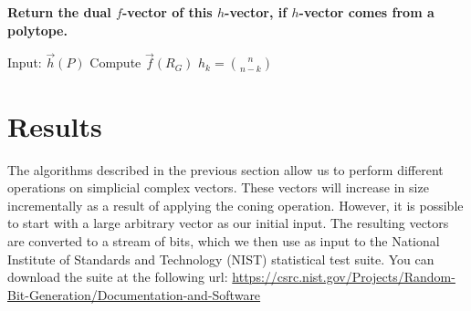 \documentclass[oneside,12pt]{amsart}
\theoremstyle{definition}
\numberwithin{equation}{section}
\begin{document}
\vspace{.5in}

\begin{center}
\textbf{Return the dual $f$-vector of this $h$-vector, if $h$-vector comes from a polytope.}
\end{center}

\vspace{.1in}


\begin{algorithmic}
\State Input: $\overrightarrow{h}(P)$
\State Compute $\overrightarrow{f}(R_G)$
\State    $h_k = {n \choose n-k}$
\Else
{}%
\EndIf
\EndFor
\EndFor
\end{algorithmic}




\newpage
\section{Results} \label{results}



\sloppy
The algorithms described in the previous section allow us to perform different operations on simplicial complex vectors. These vectors will increase in size incrementally as a result of applying the coning operation.  However, it is possible to start with a large arbitrary vector as our initial input. The resulting vectors are converted to a stream of bits, which we then use as input to the National Institute of Standards and Technology (NIST) statistical test suite. You can download the suite at the following url:  \url{https://csrc.nist.gov/Projects/Random-Bit-Generation/Documentation-and-Software}
\end{document}
